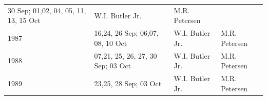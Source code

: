 \documentclass[]{article}
\begin{document}
\begin{longtable}[]{@{}llll@{}}
\begin{minipage}[t]{0.38\columnwidth}
30 Sep; 01,02, 04, 05, 11, 13, 15 Oct\strut
\end{minipage} & \begin{minipage}[t]{0.18\columnwidth}\raggedright\strut
W.I. Butler Jr.\strut
\end{minipage} & \begin{minipage}[t]{0.20\columnwidth}\raggedright\strut
M.R. Petersen\strut
\end{minipage}\tabularnewline
\begin{minipage}[t]{0.12\columnwidth}\raggedright\strut
1987\strut
\end{minipage} & \begin{minipage}[t]{0.38\columnwidth}\raggedright\strut
16,24, 26 Sep; 06,07, 08, 10 Oct\strut
\end{minipage} & \begin{minipage}[t]{0.18\columnwidth}\raggedright\strut
W.I. Butler Jr.\strut
\end{minipage} & \begin{minipage}[t]{0.20\columnwidth}\raggedright\strut
M.R. Petersen\strut
\end{minipage}\tabularnewline
\begin{minipage}[t]{0.12\columnwidth}\raggedright\strut
1988\strut
\end{minipage} & \begin{minipage}[t]{0.38\columnwidth}\raggedright\strut
07,21, 25, 26, 27, 30 Sep; 03 Oct\strut
\end{minipage} & \begin{minipage}[t]{0.18\columnwidth}\raggedright\strut
W.I. Butler Jr.\strut
\end{minipage} & \begin{minipage}[t]{0.20\columnwidth}\raggedright\strut
M.R. Petersen\strut
\end{minipage}\tabularnewline
\begin{minipage}[t]{0.12\columnwidth}\raggedright\strut
1989\strut
\end{minipage} & \begin{minipage}[t]{0.38\columnwidth}\raggedright\strut
23,25, 28 Sep; 03 Oct\strut
\end{minipage} & \begin{minipage}[t]{0.18\columnwidth}\raggedright\strut
W.I. Butler Jr.\strut
\end{minipage} & \begin{minipage}[t]{0.20\columnwidth}\raggedright\strut
M.R. Petersen\strut
\end{minipage}\tabularnewline

\end{longtable}
\end{document}
